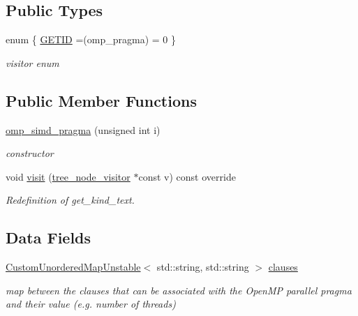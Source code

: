 \subsection*{Public Types}
\begin{DoxyCompactItemize}
\item 
enum \{ \hyperlink{structomp__simd__pragma_aad9fdd096726288087c584bfae74973eac905e24af5925d314d16656796016ed6}{G\+E\+T\+ID} =(omp\+\_\+pragma) = 0
 \}\begin{DoxyCompactList}\small\item\em visitor enum \end{DoxyCompactList}
\end{DoxyCompactItemize}
\subsection*{Public Member Functions}
\begin{DoxyCompactItemize}
\item 
\hyperlink{structomp__simd__pragma_aa9e67505c60e8693724c18e7cc4f1c2d}{omp\+\_\+simd\+\_\+pragma} (unsigned int i)
\begin{DoxyCompactList}\small\item\em constructor \end{DoxyCompactList}\item 
void \hyperlink{structomp__simd__pragma_aea58522f1cbf5637c63588430acf77f2}{visit} (\hyperlink{classtree__node__visitor}{tree\+\_\+node\+\_\+visitor} $\ast$const v) const override
\begin{DoxyCompactList}\small\item\em Redefinition of get\+\_\+kind\+\_\+text. \end{DoxyCompactList}\end{DoxyCompactItemize}
\subsection*{Data Fields}
\begin{DoxyCompactItemize}
\item 
\hyperlink{custom__map_8hpp_a8cbaceffc09790a885ec7e9c17809c69}{Custom\+Unordered\+Map\+Unstable}$<$ std\+::string, std\+::string $>$ \hyperlink{structomp__simd__pragma_a268b6c71799005c9dfb291f480d601c7}{clauses}
\begin{DoxyCompactList}\small\item\em map between the clauses that can be associated with the Open\+MP parallel pragma and their value (e.\+g. number of threads) \end{DoxyCompactList}\end{DoxyCompactItemize}
